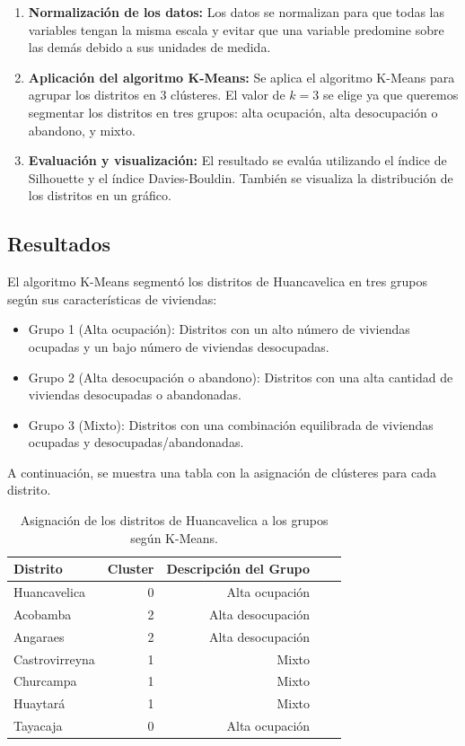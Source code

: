\documentclass[12pt]{book}
\begin{document}
	\begin{enumerate}
		\item \textbf{Normalización de los datos:} Los datos se normalizan para que todas las variables tengan la misma escala y evitar que una variable predomine sobre las demás debido a sus unidades de medida.
		\item \textbf{Aplicación del algoritmo K-Means:} Se aplica el algoritmo K-Means para agrupar los distritos en 3 clústeres. El valor de \( k = 3 \) se elige ya que queremos segmentar los distritos en tres grupos: alta ocupación, alta desocupación o abandono, y mixto.
		\item \textbf{Evaluación y visualización:} El resultado se evalúa utilizando el índice de Silhouette y el índice Davies-Bouldin. También se visualiza la distribución de los distritos en un gráfico.
	\end{enumerate}
	
	\subsection{Resultados}
	El algoritmo K-Means segmentó los distritos de Huancavelica en tres grupos según sus características de viviendas:
	
	\begin{itemize}
		\item Grupo 1 (Alta ocupación): Distritos con un alto número de viviendas ocupadas y un bajo número de viviendas desocupadas.
		\item Grupo 2 (Alta desocupación o abandono): Distritos con una alta cantidad de viviendas desocupadas o abandonadas.
		\item Grupo 3 (Mixto): Distritos con una combinación equilibrada de viviendas ocupadas y desocupadas/abandonadas.
	\end{itemize}
	
	A continuación, se muestra una tabla con la asignación de clústeres para cada distrito.
	
	\begin{table}[h!]
		\centering
		\begin{tabular}{|l|r|r|r|r|}
			\hline
			\textbf{Distrito} & \textbf{Cluster} & \textbf{Descripción del Grupo} \\
			\hline
			Huancavelica       & 0  & Alta ocupación \\
			Acobamba            & 2  & Alta desocupación \\
			Angaraes            & 2  & Alta desocupación \\
			Castrovirreyna      & 1  & Mixto \\
			Churcampa           & 1  & Mixto \\
			Huaytará            & 1  & Mixto \\
			Tayacaja            & 0  & Alta ocupación \\
			\hline
		\end{tabular}
		\caption{Asignación de los distritos de Huancavelica a los grupos según K-Means.}
		\label{tab:clusters}
	\end{table}
	
\end{document}
